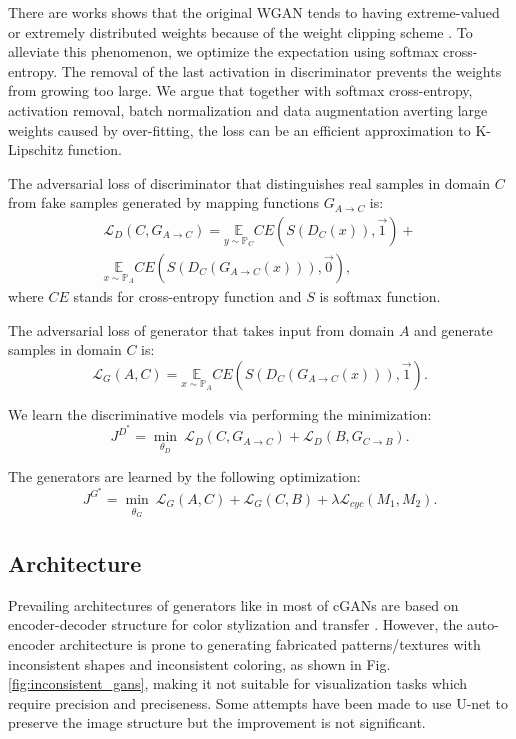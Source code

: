 \documentclass[10pt,conference,a4paper]{IEEEtran}
\begin{document}
There are works shows that the original WGAN tends to having extreme-valued or extremely distributed weights because of the weight clipping scheme \cite{improvewgan2017}. To alleviate this phenomenon, we optimize the expectation using softmax cross-entropy. The removal of the last activation in discriminator prevents the weights from growing too large. We argue that together with softmax cross-entropy, activation removal, batch normalization and data augmentation averting large weights caused by over-fitting, the loss can be an efficient approximation to K-Lipschitz function.

The adversarial loss of discriminator that distinguishes real samples in domain $C$ from fake samples generated by mapping functions $G_{A\rightarrow C}$ is:
\begin{multline}\label{eq:loss_da}
  \mathcal{L}_{D}(C,G_{A\rightarrow C}) = \underset{y\sim \mathbb{P}_C}{\mathbb{E}}  CE\left(S(D_C(x)),\vec{1} \right) +\\
  \underset{x\sim \mathbb{P}_A}{\mathbb{E}} CE\left(S(D_C( G_{A\rightarrow C}(x))),\vec{0} \right) ,
\end{multline}
where $CE$ stands for cross-entropy function and $S$ is softmax function.

The adversarial loss of generator that takes input from domain $A$ and generate samples in domain $C$ is:
\begin{equation}\label{eq:adv_loss_ga}
  \mathcal{L}_G(A,C)= \underset{x\sim \mathbb{P}_A}{\mathbb{E}} CE\left(S(D_C(G_{A\rightarrow C}(x))),\vec{1} \right).
\end{equation}

We learn the discriminative models via performing the minimization:
\begin{equation}\label{eq:objective_d}
J^{D^*} = \underset{\theta_D}{\min}~ \mathcal{L}_{D}(C,G_{A\rightarrow C})+\mathcal{L}_{D}(B,G_{C\rightarrow B}).
\end{equation}

The generators are learned by the following optimization:
\begin{equation}\label{eq:objective_g}
J^{G^*}= \underset{\substack{\theta_G}}{\min}~
\mathcal{L}_G(A,C)+
\mathcal{L}_G(C,B)+
\lambda \mathcal{L}_{cyc}(M_1,M_2).
\end{equation}



\subsection{Architecture}
\label{sec:arch}
Prevailing architectures of generators like in most of cGANs \cite{cgan} are based on encoder-decoder structure for color stylization and transfer \cite{pix2pix,cyclegan}.
However, the auto-encoder architecture is prone to generating fabricated patterns/textures with inconsistent shapes and inconsistent coloring, as shown in Fig. \ref{fig:inconsistent_gans}, making it not suitable for visualization tasks which require precision and preciseness.
Some attempts have been made to use U-net to preserve the image structure \cite{pix2pix,dualgan} but the improvement is not significant.
\end{document}
